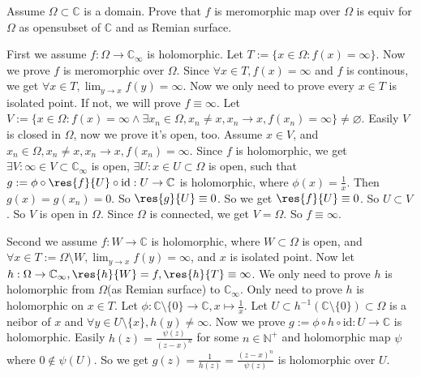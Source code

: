 \documentclass{ctexart}
\newif\ifpreface
\begin{document}
\large
\setlength{\baselineskip}{1.2em}
\ifpreface
	
	\newgeometry{left=2cm,right=2cm,top=2cm,bottom=2cm}
\else
	\maketitle
\fi
\begin{problem}
Assume \(\Omega \subset \mathbb{C}\) is a domain. Prove that \(f\) is meromorphic map over \(\Omega\) is equiv for \(\Omega\) as opensubset of \(\mathbb{C}\) and as Remian surface.
\end{problem}

\begin{solution}
	First we assume \(f:\Omega \to \mathbb{C}_{\infty}\) is holomorphic. Let \(T:=\{x \in \Omega:f(x)=\infty\}\).
	Now we prove \(f\) is meromorphic over \(\Omega\).
	Since \(\forall x \in T,f(x)=\infty\) and \(f\) is continous, we get \(\forall x \in T,\lim_{y \to x}f(y)=\infty\).
	Now we only need to prove every \(x \in T\) is isolated point. If not, we will prove \(f \equiv \infty\).
	Let \(V:=\{x \in \Omega:f(x)=\infty \wedge \exists x_n \in \Omega,x_n \neq x,x_n \to x,f(x_n)=\infty\} \neq \varnothing\).
	Easily \(V\) is closed in \(\Omega\), now we prove it's open, too.
	Assume \(x \in V\), and \(x_n \in \Omega,x_n \neq x,x_n \to x,f(x_n)=\infty\).
	Since \(f\) is holomorphic, we get \(\exists V:\infty \in V \subset \mathbb{C}_{\infty}\) is open, \(\exists U:x \in U \subset \Omega\) is open,
	such that \(g:=\phi \circ \res{f}{U} \circ \text{id}:U \to \mathbb{C}\) is holomorphic, where \(\phi(x)=\frac{1}{x}\).
	Then \(g(x)=g(x_n)=0\). So \(\res{g}{U}\equiv 0\). So we get \(\res{f}{U} \equiv 0\). So \(U \subset V\).
	So \(V\) is open in \(\Omega\). Since \(\Omega \) is connected, we get \(V=\Omega\).
	So \(f \equiv \infty\).

	Second we assume \(f:W \to \mathbb{C}\) is holomorphic, where \(W \subset \Omega\) is open,
	and \(\forall x \in T:=\Omega \setminus W,\lim_{y \to x}f(y)=\infty\), and \(x\) is isolated point.
	Now let \(h:\Omega \to \mathbb{C}_{\infty},\res{h}{W}=f,\res{h}{T}\equiv \infty\).
	We only need to prove \(h\) is holomorphic from \(\Omega\)(as Remian surface) to \(\mathbb{C}_{\infty}\).
	Only need to prove \( h\) is holomorphic on \(x \in T\). Let \(\phi:\mathbb{C}\setminus \{0\}\to \mathbb{C},x \mapsto \frac{1}{x}\).
	Let \(U \subset h^{-1}(\mathbb{C} \setminus \{0\}) \subset \Omega\) is a neibor of \(x\) and \(\forall y \in U \setminus \{x\},h(y)\neq \infty\).
	Now we prove \(g:=\phi \circ h \circ \text{id}:U \to \mathbb{C}\) is holomorphic.
	Easily \(h(z)= \frac{\psi(z)}{(z-x)^n}\) for some \(n \in \mathbb{N}^+\) and holomorphic map \(\psi\) where \(0 \notin \psi(U)\).
	So we get \(g(z)=\frac{1}{h(z)}=\frac{(z-x)^n}{\psi(z)}\) is holomorphic over \(U\).
\end{solution}
\end{document}
